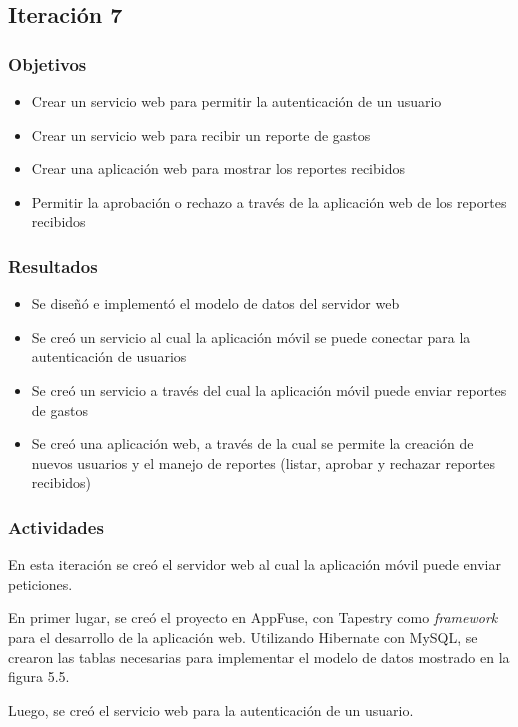 \subsection{Iteración 7}
\subsubsection{Objetivos}
\begin{itemize}
\item Crear un servicio web para permitir la autenticación de un usuario
\item Crear un servicio web para recibir un reporte de gastos
\item Crear una aplicación web para mostrar los reportes recibidos
\item Permitir la aprobación o rechazo a través de la aplicación web de los reportes recibidos
\end{itemize}
\subsubsection{Resultados}
\begin{itemize}
\item Se diseñó e implementó el modelo de datos del servidor web
\item Se creó un servicio al cual la aplicación móvil se puede conectar para la autenticación de usuarios
\item Se creó un servicio a través del cual la aplicación móvil puede enviar reportes de gastos
\item Se creó una aplicación web, a través de la cual se permite la creación de nuevos usuarios y el manejo de reportes (listar, aprobar y rechazar reportes recibidos)
\end{itemize}

\subsubsection{Actividades}

En esta iteración se creó el servidor web al cual la aplicación móvil puede enviar peticiones.

En primer lugar, se creó el proyecto en AppFuse, con Tapestry como \textit{framework} para el desarrollo de la aplicación web. Utilizando Hibernate con MySQL, se crearon las tablas necesarias para implementar el modelo de datos mostrado en la figura 5.5.

Luego, se creó el servicio web para la autenticación de un usuario. 

